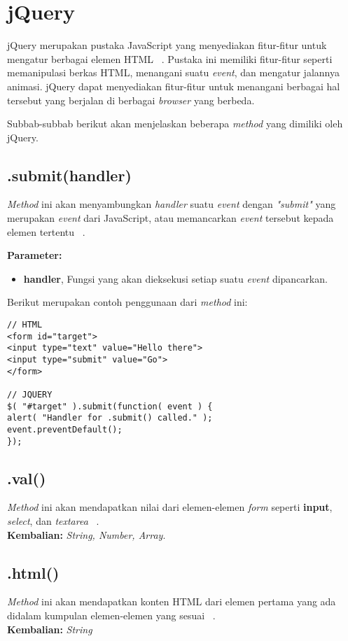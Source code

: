 \section{jQuery}
\label{sec:jQuery}

jQuery merupakan pustaka JavaScript yang menyediakan fitur-fitur untuk mengatur berbagai elemen HTML ~\cite{jQuery}. Pustaka ini memiliki fitur-fitur seperti memanipulasi berkas HTML, menangani suatu \textit{event}, dan mengatur jalannya animasi. jQuery dapat menyediakan fitur-fitur untuk menangani berbagai hal tersebut yang berjalan di berbagai \textit{browser} yang berbeda.

Subbab-subbab berikut akan menjelaskan beberapa \textit{method} yang dimiliki oleh jQuery.

\subsection{.submit(handler)}
\textit{Method} ini akan menyambungkan \textit{handler} suatu \textit{event} dengan \textit{"submit"} yang merupakan \textit{event} dari JavaScript, atau memancarkan \textit{event} tersebut kepada elemen tertentu ~\cite{jQueryAPI}. 

\textbf{Parameter:}
\begin{itemize}
	\item \textbf{handler}, Fungsi yang akan dieksekusi setiap suatu \textit{event} dipancarkan.
\end{itemize}

Berikut merupakan contoh penggunaan dari \textit{method} ini:

\begin{lstlisting}
// HTML
<form id="target">
<input type="text" value="Hello there">
<input type="submit" value="Go">
</form>

// JQUERY
$( "#target" ).submit(function( event ) {
alert( "Handler for .submit() called." );
event.preventDefault();
});
\end{lstlisting}

\subsection{.val()}
\textit{Method} ini akan mendapatkan nilai dari elemen-elemen \textit{form} seperti \textbf{input}, \textit{select}, dan \textit{textarea} ~\cite{jQueryAPI}. \\
\textbf{Kembalian:} \textit{String, Number, Array}.

\subsection{.html()}
\textit{Method} ini akan mendapatkan konten HTML dari elemen pertama yang ada didalam kumpulan elemen-elemen yang sesuai ~\cite{jQueryAPI}. \\
\textbf{Kembalian:} \textit{String}

